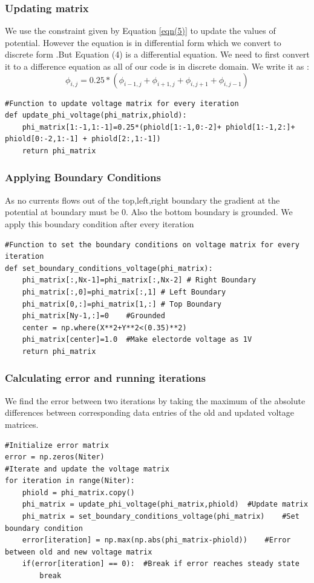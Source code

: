\documentclass[11pt, a4paper]{article}
\begin{document}
\subsubsection{Updating matrix}
We use the constraint given by Equation \ref{eqn(5)} to update the values of potential. However the equation is in differential form which we convert to discrete form 
.But Equation (4) is a differential equation. We need to first convert it to a difference equation as all of our code is in discrete domain.
We write it as :
\begin{equation}
    \phi_{i,j} = 0.25*(\phi_{i-1,j} + \phi_{i+1,j} + \phi_{i,j+1} + \phi_{i,j-1})
\end{equation}
\begin{lstlisting}
#Function to update voltage matrix for every iteration
def update_phi_voltage(phi_matrix,phiold):
    phi_matrix[1:-1,1:-1]=0.25*(phiold[1:-1,0:-2]+ phiold[1:-1,2:]+ phiold[0:-2,1:-1] + phiold[2:,1:-1])
    return phi_matrix
\end{lstlisting}

\subsubsection{Applying Boundary Conditions}
As no currents flows out of the top,left,right boundary the gradient at the potential at boundary must be 0. Also the bottom boundary is grounded. We apply this boundary condition after every iteration
\begin{lstlisting}
#Function to set the boundary conditions on voltage matrix for every iteration
def set_boundary_conditions_voltage(phi_matrix):
    phi_matrix[:,Nx-1]=phi_matrix[:,Nx-2] # Right Boundary
    phi_matrix[:,0]=phi_matrix[:,1] # Left Boundary
    phi_matrix[0,:]=phi_matrix[1,:] # Top Boundary
    phi_matrix[Ny-1,:]=0    #Grounded
    center = np.where(X**2+Y**2<(0.35)**2)
    phi_matrix[center]=1.0  #Make electorde voltage as 1V
    return phi_matrix
\end{lstlisting}

\subsubsection{Calculating error and running iterations}
We find the error between two iterations by taking the maximum of the absolute differences between corresponding data entries of the old and updated voltage matrices.
\begin{lstlisting}
#Initialize error matrix
error = np.zeros(Niter)
#Iterate and update the voltage matrix
for iteration in range(Niter):
    phiold = phi_matrix.copy()
    phi_matrix = update_phi_voltage(phi_matrix,phiold)  #Update matrix
    phi_matrix = set_boundary_conditions_voltage(phi_matrix)    #Set boundary condition
    error[iteration] = np.max(np.abs(phi_matrix-phiold))    #Error between old and new voltage matrix
    if(error[iteration] == 0):  #Break if error reaches steady state
        break
\end{lstlisting}
\end{document}
